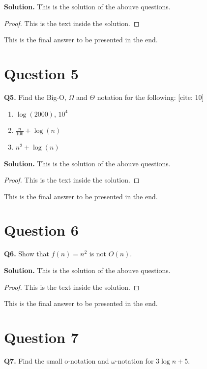 \documentclass[11pt]{article}
\begin{document}
\textbf{Solution. } This is the solution of the abouve questions. 
\begin{proof}
This is the text inside the solution. 
\end{proof}

\begin{finalanswer}
This is the final answer to be presented in the end. 
\end{finalanswer}

\section{Question 5}
\textbf{Q5.} Find the Big-O, $\Omega$ and $\Theta$ notation for the following: [cite: 10]
    \begin{enumerate}
        \item $\log(2000)$, $10^4$ 
        \item $\frac{n}{100}+\log(n)$ 
        \item $n^2+\log(n)$ 
    \end{enumerate}

\textbf{Solution. } This is the solution of the abouve questions. 
\begin{proof}
This is the text inside the solution. 
\end{proof}

\begin{finalanswer}
This is the final answer to be presented in the end. 
\end{finalanswer}

\section{Question 6}
\textbf{Q6.} Show that $f(n)=n^2$ is not $O(n)$. 

\textbf{Solution. } This is the solution of the abouve questions. 
\begin{proof}
This is the text inside the solution. 
\end{proof}

\begin{finalanswer}
This is the final answer to be presented in the end. 
\end{finalanswer}

\section{Question 7}
\textbf{Q7.} Find the small o-notation and $\omega$-notation for $3 \log n+5$. 
\end{document}
